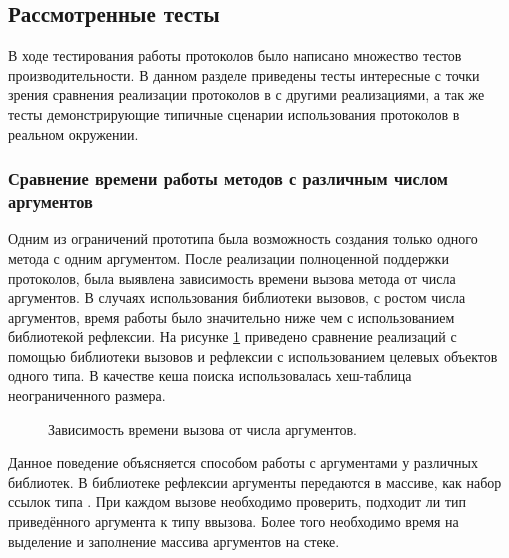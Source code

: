 \subsection{Рассмотренные тесты}
В ходе тестирования работы протоколов было написано множество тестов производительности. В данном разделе приведены тесты интересные с точки зрения сравнения реализации протоколов в  с другими реализациями, а так же тесты демонстрирующие типичные сценарии использования протоколов в реальном окружении.

\subsubsection{Сравнение времени работы методов с различным числом аргументов}
Одним из ограничений прототипа была возможность создания только одного метода с одним аргументом. После реализации полноценной поддержки протоколов, была выявлена зависимость времени вызова метода от числа аргументов. В случаях использования библиотеки вызовов, с ростом числа аргументов, время работы было значительно ниже чем с использованием библиотекой рефлексии. На рисунке \ref{plot:bench:argsCount} приведено сравнение реализаций с помощью библиотеки вызовов и рефлексии с использованием целевых объектов одного типа. В качестве кеша поиска использовалась хеш-таблица неограниченного размера.

\begin{figure}
\caption{\label{plot:bench:argsCount}Зависимость времени вызова от числа аргументов.}
\end{figure}

Данное поведение объясняется способом работы с аргументами у различных библиотек. В библиотеке рефлексии аргументы передаются в массиве, как набор ссылок типа . При каждом вызове необходимо проверить, подходит ли тип приведённого аргумента к типу ввызова. Более того необходимо время на выделение и заполнение массива аргументов на стеке.

